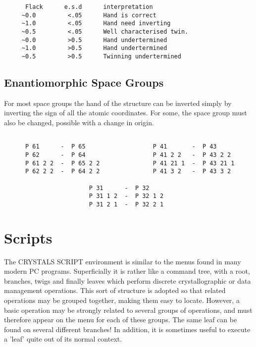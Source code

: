 \documentclass[10pt,a4paper]{report}
\begin{document}
\bigskip{}


\small\begin{verbatim}
      Flack      e.s.d      interpretation
     ~0.0         <.05      Hand is correct
     ~1.0         <.05      Hand need inverting
     ~0.5         <.05      Well characterised twin.
     ~0.0         >0.5      Hand undertermined
     ~1.0         >0.5      Hand undertermined
     ~0.5         >0.5      Twinning undertermined
\end{verbatim}\normalsize


\section{Enantiomorphic Space Groups}
For most space groups the hand of the structure can be inverted simply
by inverting the sign of all the atomic coordinates. For some, the space
group must also be changed, possible with a change in origin.
\small\begin{verbatim}

      P 61      -  P 65                   P 41       -  P 43
      P 62      -  P 64                   P 41 2 2   -  P 43 2 2
      P 61 2 2  -  P 65 2 2               P 41 21 1  -  P 43 21 1
      P 62 2 2  -  P 64 2 2               P 41 3 2   -  P 43 3 2

                        P 31      -  P 32
                        P 31 1 2  -  P 32 1 2
                        P 31 2 1  -  P 32 2 1
\end{verbatim}\normalsize






\chapter{Scripts}


The CRYSTALS SCRIPT environment is similar to the menus found in many modern PC programs. Superficially it is rather like a command tree, with a root, branches, twigs and finally leaves which perform discrete crystallographic or data management operations. This sort of structure is adopted so that related operations may be grouped together, making them easy to locate. However, a basic operation may be strongly related to several groups of operations, and must therefore appear on the menu for each of these groups. The same leaf can be found on several different branches! In addition, it is sometimes useful to execute a 'leaf' quite out of its normal context.
\end{document}
